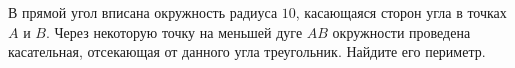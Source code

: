 \begin{ex}
	\begin{condition}
		В прямой угол вписана окружность радиуса \( 10 \), касающаяся сторон угла в точках \( A \) и \( B \). Через некоторую точку на меньшей дуге \( AB \) окружности проведена касательная, отсекающая от данного угла треугольник. Найдите его периметр.
	\end{condition}
\end{ex}